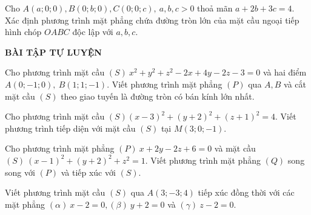 \begin{vd}%
	Cho $ A(a;0;0), B(0;b;0), C(0;0;c), \ a, b, c >0 $ thoả mãn $ a + 2b + 3c = 4 $. Xác định phương trình mặt phẳng chứa đường tròn lớn của mặt cầu ngoại tiếp hình chóp $ OABC $ độc lập với $ a, b, c $.

\end{vd}
\begin{center}		
	\textbf{BÀI TẬP TỰ LUYỆN}
\end{center}
\begin{bt}%
	Cho phương trình mặt cầu $ (S) \ x^2 + y^2 + z^2 -2x + 4y -2z -3 =0 $ và hai điểm $ A(0;-1;0), \ B(1;1;-1) $. Viết phương trình mặt phẳng $ (P) $ qua $ A, B $ và cắt mặt cầu $ (S) $ theo giao tuyến là đường tròn có bán kính lớn nhất.
\end{bt}
\begin{bt}%
	Cho phương trình mặt cầu $ (S) (x-3)^2 + (y+2)^2 + (z+1)^2 = 4 $. Viết phương trình tiếp diện với mặt cầu $ (S) $ tại $ M(3;0;-1) $.
\end{bt}
\begin{bt}%
	Cho phương trình mặt phẳng $ (P) \ x + 2y - 2z + 6 = 0 $ và mặt cầu $ (S) \ (x-1)^2 + (y+2)^2 + z^2 = 1 $. Viết phương trình mặt phẳng $ (Q) $ song song với $ (P) $ và tiếp xúc với $ (S) $.
\end{bt}
\begin{bt}%
	Viết phương trình mặt cầu $ (S) $ qua $ A(3;-3;4) $ tiếp xúc đồng thời với các mặt phẳng $ (\alpha) \ x - 2 = 0, (\beta) \ y + 2 = 0 $ và $ (\gamma) \ z - 2 = 0$.
\end{bt}


